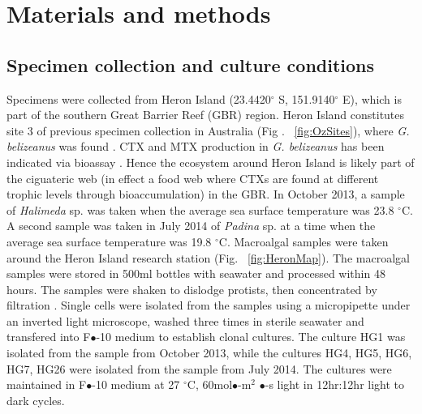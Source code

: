 \documentclass[12pt]{article}
\begin{document}
 \newpage
\section{Materials and methods}

\subsection{Specimen collection and culture conditions}
Specimens were collected from Heron Island (23.4420$^{\circ}$ S, 151.9140$^{\circ}$ E), which is part of the southern Great Barrier Reef (GBR) region. Heron Island constitutes site 3 of previous specimen collection in Australia (Fig . ~\ref{fig:OzSites}), where \emph{G. belizeanus} was found \citep{murray2014molecular}. CTX and MTX production in \emph{G. belizeanus} has been indicated via bioassay \citep{chinain2010growth,holland2013differences}. Hence the ecosystem around Heron Island is likely part of the ciguateric web (in effect a food web where CTXs are found at different trophic levels through bioaccumulation) in the GBR.
In October 2013, a sample of \emph{Halimeda} sp. was taken when the average sea surface temperature was 23.8 $^{\circ}$C. 
A second sample was taken in July 2014 of \emph{Padina} sp. at a time when the average sea surface temperature was 19.8 $^{\circ}$C.
Macroalgal samples were taken around the Heron Island research station (Fig. ~\ref{fig:HeronMap}). The macroalgal samples were stored in 500ml bottles with seawater and processed within 48 hours. The samples were shaken to dislodge protists, then concentrated by filtration \citep{litaker2010global}. Single cells were isolated from the samples using a micropipette under an inverted light microscope, washed three times in sterile seawater and transfered into F$\bullet$-10 medium \citep{holmes1991strain} to establish clonal cultures.
The culture HG1 was isolated from the sample from October 2013, while the cultures HG4, HG5, HG6, HG7, HG26 were isolated from the sample from July 2014.
The cultures were maintained in F$\bullet$-10 medium at 27 $^{\circ}$C, 60mol$\bullet$-m$^{2}$ $\bullet$-s light in 12hr:12hr light to dark cycles.


\end{document}
